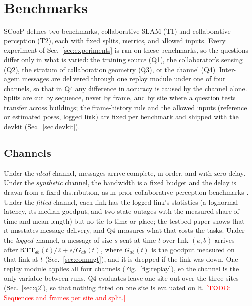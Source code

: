 \documentclass[journal]{IEEEtran}
\newcommand{\todo}[1]{\textcolor{red}{[TODO: #1]}}
\begin{document}
\section{Benchmarks}
\label{sec:benchmarks}
SCooP defines two benchmarks, collaborative SLAM (T1) and collaborative
perception (T2), each with fixed splits, metrics, and allowed inputs.
Every experiment of Sec.~\ref{sec:experiments} is run on these
benchmarks, so the questions differ only in what is varied: the
training source (Q1), the collaborator's sensing (Q2), the stratum of
collaboration geometry (Q3), or the channel (Q4). Inter-agent messages
are delivered through one replay module under one of four channels,
so that in Q4 any difference in accuracy is caused by the channel
alone. Splits are cut by sequence, never by frame, and by site where a
question tests transfer across buildings; the frame-history rule and
the allowed inputs (reference or estimated poses, logged link) are
fixed per benchmark and shipped with the devkit
(Sec.~\ref{sec:devkit}).

\subsection{Channels}
\label{sec:channels}
Under the \emph{ideal} channel, messages arrive complete, in order,
and with zero delay. Under the \emph{synthetic} channel, the
bandwidth is a fixed budget and the delay is drawn from a fixed
distribution, as in prior collaborative perception benchmarks
\cite{where2comm,v2xvit}. Under the \emph{fitted} channel, each link
has the logged link's statistics (a lognormal latency, its median
goodput, and two-state outages with the measured share of time and
mean length) but no tie to time or place; the testbed paper
\cite{scoop_testbed} shows that it misstates message delivery, and Q4
measures what that costs the tasks. Under the \emph{logged} channel, a message
of size $s$ sent at time $t$ over link $(a,b)$ arrives after
$\mathrm{RTT}_{ab}(t)/2 + s/G_{ab}(t)$, where $G_{ab}(t)$ is the
goodput measured on that link at $t$ (Sec.~\ref{sec:commgt}), and it
is dropped if the link was down. One replay module applies all four
channels (Fig.~\ref{fig:replay}), so the channel is the only
variable between runs. Q4 evaluates leave-one-site-out over the
three sites (Sec.~\ref{sec:q2}), so that nothing fitted on one site
is evaluated on it. \todo{Sequences and frames per site and split.}
\end{document}
